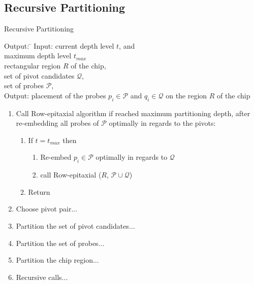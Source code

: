 \documentclass[runningheads]{llncs}
\begin{document}
\subsection{Recursive Partitioning}

\begin{algorithm}
\caption{Recursive Partitioning}
\label{alg:recursivepart}
\begin{minipage}{4.8in}

\begin{tabbing}
Output: \=									\kill
Input:  \> current depth level $t$, and						\\
        \> maximum depth level $t_{max}$					\\
        \> rectangular region $R$ of the chip,					\\
        \> set of pivot candidates $\mathcal{Q}$,				\\
        \> set of probes $\mathcal{P}$,						\\
Output: \> placement of the probes $p_i \in \mathcal{P}$ and
           $q_i \in \mathcal{Q}$ on the region $R$ of the chip
\end{tabbing}

\begin{enumerate}
\item Call Row-epitaxial algorithm if reached maximum partitioning depth,
after re-embedding all probes of $\mathcal{P}$ optimally in regards to the
pivots:
  \begin{enumerate}
  \item If $t = t_{max}$ then
  \begin{enumerate}
    \item Re-embed $p_i \in \mathcal{P}$ optimally in regards to $\mathcal{Q}$
    \item call Row-epitaxial ($R$, $\mathcal{P} \cup \mathcal{Q}$)
  \end{enumerate}
  \item Return
  \end{enumerate}
\item Choose pivot pair...
\item Partition the set of pivot candidates...
\item Partition the set of probes...
\item Partition the chip region...
\item Recursive calls...
\end{enumerate}

\end{minipage}
\end{algorithm}
\end{document}
